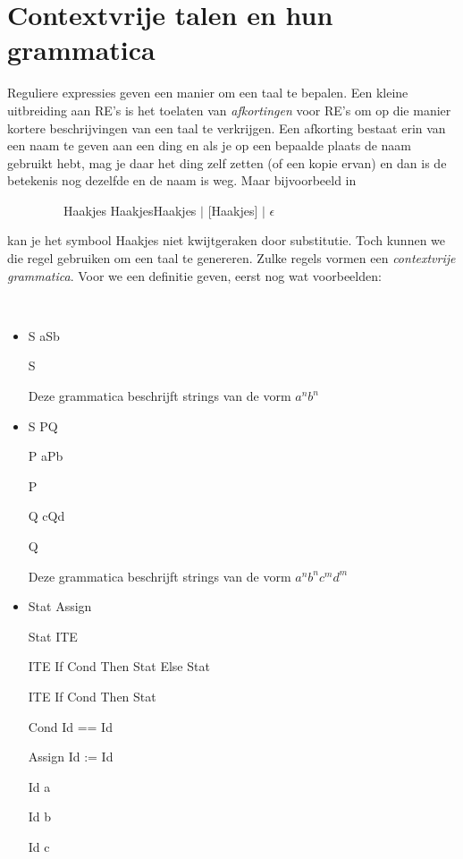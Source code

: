 \clearpage

\section{Contextvrije talen en hun grammatica}\label{contextvrijetalen}

Reguliere expressies geven een manier om een taal te bepalen. Een
kleine uitbreiding aan RE's is het toelaten van {\em afkortingen} voor
RE's om op die manier kortere beschrijvingen van een taal te
verkrijgen. Een afkorting bestaat erin van een naam te geven aan een
ding en als je op een bepaalde plaats de naam gebruikt hebt, mag je
daar het ding zelf zetten (of een kopie ervan) en dan is de betekenis
nog dezelfde en de naam is weg. Maar bijvoorbeeld in


~~~~~~~~~Haakjes \rpijl HaakjesHaakjes $|$ [Haakjes] $|$ $\epsilon$


kan je het symbool Haakjes niet kwijtgeraken door substitutie. Toch
kunnen we die regel gebruiken om een taal te genereren. Zulke regels
vormen een {\em contextvrije grammatica}. Voor we een definitie
geven, eerst nog wat voorbeelden:

\begin{vb}
~~~
\begin{itemize}
\item
S \rpijl aSb

S \rpijl \eps

Deze grammatica beschrijft strings van de vorm $a^nb^n$

\item 

S \rpijl PQ

P \rpijl aPb

P \rpijl \eps

Q \rpijl cQd

Q \rpijl \eps

Deze grammatica beschrijft strings van de vorm $a^nb^nc^md^m$


\item \label{statlabel}
Stat \rpijl Assign

Stat \rpijl ITE

ITE \rpijl If Cond Then Stat Else Stat

ITE \rpijl If Cond Then Stat 

Cond \rpijl Id == Id

Assign \rpijl Id := Id

Id \rpijl a

Id \rpijl b

Id \rpijl c

\end{itemize}

\end{vb}

